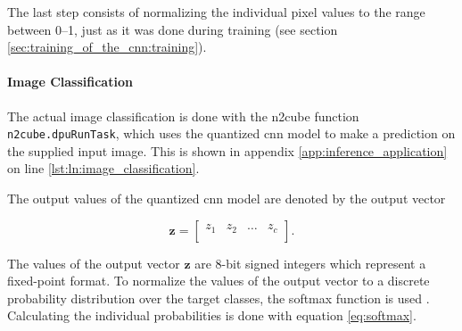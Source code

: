 The last step consists of normalizing the individual pixel values to the range between \numrange{0}{1}, just as it was done during training (see section \ref{sec:training_of_the_cnn:training}).

\paragraph{Image Classification}
The actual image classification is done with the \acrshort{n2cube} function \texttt{n2cube.dpuRunTask}, which uses the quantized \acrshort{cnn} model to make a prediction on the supplied input image.
This is shown in appendix \ref{app:inference_application} on line \ref{lst:ln:image_classification}.

The output values of the quantized \acrshort{cnn} model are denoted by the output vector

\begin{equation}
  \boldsymbol{z} =
  \begin{bmatrix}
    z_1 & z_2 & \dots & z_c \\
  \end{bmatrix}.
  \label{eq:output_vector}
\end{equation}

The values of the output vector $\boldsymbol{z}$ are 8-bit signed integers which represent a fixed-point format.
To normalize the values of the output vector to a discrete probability distribution over the target classes, the softmax function is used \cite{}. %
Calculating the individual probabilities is done with equation \ref{eq:softmax}.

